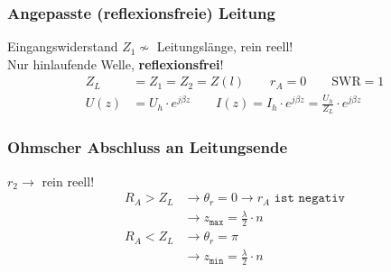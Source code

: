 %
%

\subsubsection{Angepasste (reflexionsfreie) Leitung}
Eingangswiderstand $ Z_1\nsim$ Leitungslänge, rein reell!\\
Nur hinlaufende Welle, \textbf{reflexionsfrei}!
\begin{align*}
	Z_L          & = Z_1 = Z_2 = Z(l) \qquad
	r_A          =0 \qquad 
	\mathrm{SWR} = 1  \\
	U(z)         & = U_h\cdot e ^{j\beta z}  \qquad           
	I(z)         = I_h \cdot e^{j\beta z} = \frac{U_h}{Z_L}\cdot e^{j\beta z}
\end{align*}

\subsubsection{Ohmscher Abschluss an Leitungsende}
$ r_2 \rightarrow$ rein reell! 
\begin{align*}
	R_A > Z_L & \rightarrow\theta_r = 0 \rightarrow r_A \texttt{ ist negativ} \\
	& \rightarrow z_\texttt{max}=\frac{\lambda}{2}\cdot n\\
	R_A < Z_L& \rightarrow\theta_r = \pi                           \\
	& \rightarrow z_\texttt{min}=\frac{\lambda}{2}\cdot n
\end{align*}

